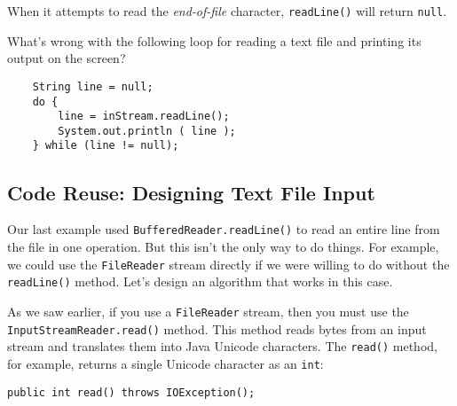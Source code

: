 \noindent When it attempts to read the {\it end-of-file}
character, {\tt readLine()} will return {\tt null}.



\label{self-study-exercise}
\begin{SSTUDY}

\item  What's wrong with the following loop for reading
a text file and printing its output on the screen?

\begin{jjjlisting}
\begin{lstlisting}
    String line = null;
    do {
        line = inStream.readLine();
        System.out.println ( line );
    } while (line != null);
\end{lstlisting}
\end{jjjlisting}
\end{SSTUDY}

\subsection{Code Reuse: Designing Text File Input}
\noindent Our last example used {\tt BufferedReader.readLine()} to read an entire
line from the file in one operation.  But this isn't the only way
to do things.  For example, we could use the {\tt FileReader}
stream directly if we were willing to do without the {\tt readLine()}
method.  Let's design an algorithm that works in this case.

As we saw earlier, if you use a {\tt FileReader} stream, then you must
use the {\tt InputStreamReader.read()} method.  This method reads bytes
from an input stream and translates them into Java Unicode characters.
The {\tt read()} method, for example, returns a single Unicode character
as an {\tt int}:

\begin{jjjlisting}
\begin{lstlisting}
public int read() throws IOException();
\end{lstlisting}
\end{jjjlisting}

